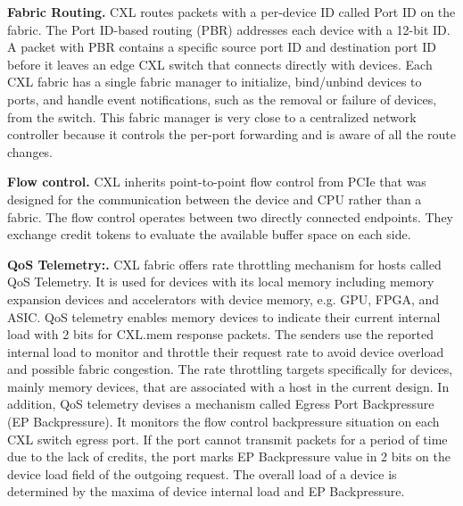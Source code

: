 \noindent \textbf{Fabric Routing.}
CXL routes packets with a per-device ID called Port ID on the fabric. 
%
The Port ID-based routing (PBR) addresses each device with a 12-bit ID. 
%
A packet with PBR contains a specific source port ID and destination port ID before it leaves an edge CXL switch that connects directly with devices.
%
Each CXL fabric has a single fabric manager to initialize, bind/unbind devices to ports, and handle event notifications, such as the removal or failure of devices, from the switch.   
%
This fabric manager is very close to a centralized network controller because it controls the per-port forwarding and is aware of all the route changes. 

\noindent \textbf{Flow control.}
CXL inherits point-to-point flow control from PCIe that was designed for the communication between the device and CPU rather than a fabric. 
%
The flow control operates between two directly connected endpoints. 
%
They exchange credit tokens to evaluate the available buffer space on each side. 

\noindent \textbf{QoS Telemetry:.}
CXL fabric offers rate throttling mechanism for hosts called QoS Telemetry. 
%
It is used for devices with its local memory including memory expansion devices and accelerators with device memory, e.g. GPU, FPGA, and ASIC.
%
QoS telemetry enables memory devices to indicate their current internal load with 2 bits for CXL.mem response packets.  
%
The senders use the reported internal load to monitor and throttle their request rate to avoid device overload and possible fabric congestion. 
%
The rate throttling targets specifically for devices, mainly memory devices, that are associated with a host in the current design. 
%
In addition, QoS telemetry devises a mechanism called Egress Port Backpressure (EP Backpressure).
%
It monitors the flow control backpressure situation on each CXL switch egress port. 
%
If the port cannot transmit packets for a period of time due to the lack of credits, the port marks EP Backpressure value in 2 bits on the device load field of the outgoing request. 
%
The overall load of a device is determined by the maxima of device internal load and EP Backpressure. 

